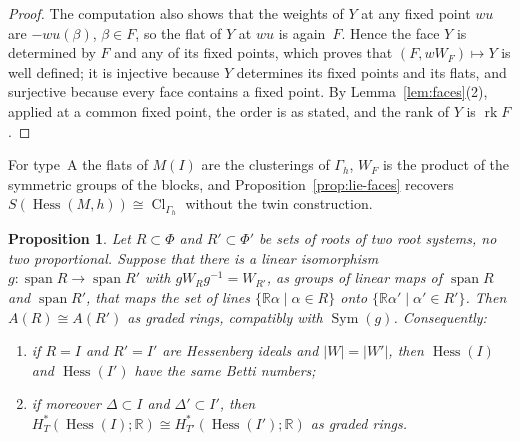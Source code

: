 \documentclass[11pt,a4paper]{article}
\numberwithin{equation}{section}
\theoremstyle{plain}
\newtheorem{proposition}[theorem]{Proposition}
\theoremstyle{definition}
\theoremstyle{remark}
\newcommand{\R}{\mathbb{R}}
\newcommand{\HT}{H^{*}_{T}}
\DeclareMathOperator{\Hess}{Hess}
\DeclareMathOperator{\rk}{rk}
\DeclareMathOperator{\Cl}{Cl}
\DeclareMathOperator{\Sym}{Sym}
\DeclareMathOperator{\spn}{span}
\begin{document}
\begin{proof}
The computation also shows that the weights of $Y$ at any fixed point $wu$ are $-wu(\beta)$, $\beta\in F$, so the flat of $Y$ at $wu$ is again~$F$. Hence the face $Y$ is determined by $F$ and any of its fixed points, which proves that $(F,wW_F)\mapsto Y$ is well defined; it is injective because $Y$ determines its fixed points and its flats, and surjective because every face contains a fixed point. By Lemma~\ref{lem:faces}(2), applied at a common fixed point, the order is as stated, and the rank of $Y$ is $\rk F$.
\end{proof}

For type~A the flats of $M(I)$ are the clusterings of $\Gamma_h$, $W_F$ is the product of the symmetric groups of the blocks, and Proposition~\ref{prop:lie-faces} recovers $S(\Hess(M,h))\cong\Cl_{\Gamma_h}$ without the twin construction.

\begin{proposition}\label{prop:lines}
Let $R\subset\Phi$ and $R'\subset\Phi'$ be sets of roots of two root systems, no two proportional. Suppose that there is a linear isomorphism $g\colon\spn R\to\spn R'$ with $gW_Rg^{-1}=W_{R'}$, as groups of linear maps of $\spn R$ and $\spn R'$, that maps the set of lines $\{\R\alpha\mid\alpha\in R\}$ onto $\{\R\alpha'\mid\alpha'\in R'\}$. Then $A(R)\cong A(R')$ as graded rings, compatibly with $\Sym(g)$. Consequently:
\begin{enumerate}[nosep,label=(\arabic*)]
\item if $R=I$ and $R'=I'$ are Hessenberg ideals and $|W|=|W'|$, then $\Hess(I)$ and $\Hess(I')$ have the same Betti numbers;
\item if moreover $\Delta\subset I$ and $\Delta'\subset I'$, then $\HT(\Hess(I);\R)\cong H^*_{T'}(\Hess(I');\R)$ as graded rings.
\end{enumerate}
\end{proposition}
\end{document}
